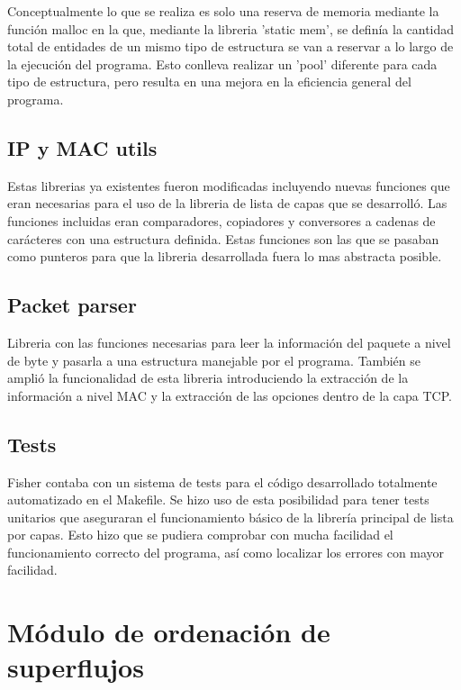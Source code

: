 \documentclass[twoside, 12pt]{epstfg}
\begin{document}
Conceptualmente lo que se realiza es solo una reserva de memoria mediante la función malloc en la que, mediante la libreria 'static mem', se definía la cantidad total de entidades de un mismo tipo de estructura se van a reservar a lo largo de la ejecución del programa. Esto conlleva realizar un 'pool' diferente para cada tipo de estructura, pero resulta en una mejora en la eficiencia general del programa. 
\subsection{IP y MAC utils}
Estas librerias ya existentes fueron modificadas incluyendo nuevas funciones que eran necesarias para el uso de la libreria de lista de capas que se desarrolló. Las funciones incluidas eran comparadores, copiadores y conversores a cadenas de carácteres con una estructura definida. Estas funciones son las que se pasaban como punteros para que la libreria desarrollada fuera lo mas abstracta posible.
\subsection{Packet parser}
Libreria con las funciones necesarias para leer la información del paquete a nivel de byte y pasarla a una estructura manejable por el programa. También se amplió la funcionalidad de esta libreria introduciendo la extracción de la información a nivel MAC y la extracción de las opciones dentro de la capa TCP.
\subsection{Tests}
Fisher contaba con un sistema de tests para el código desarrollado totalmente automatizado en el Makefile. Se hizo uso de esta posibilidad para tener tests unitarios que aseguraran el funcionamiento básico de la librería principal de lista por capas. Esto hizo que se pudiera comprobar con mucha facilidad el funcionamiento correcto del programa, así como localizar los errores con mayor facilidad.


\section{Módulo de ordenación de superflujos}
\end{document}
